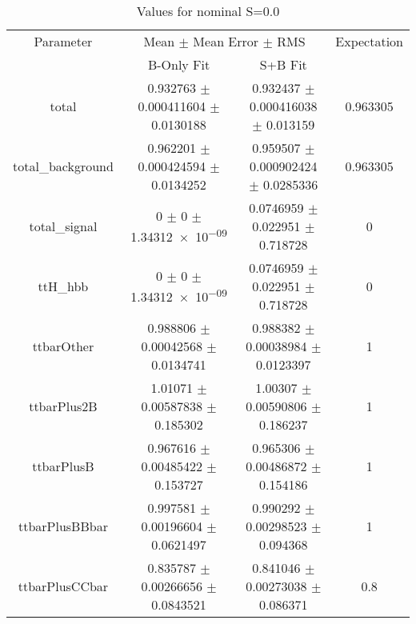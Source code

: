 \begin{table}
\centering
\caption{Values for nominal S=0.0}
\begin{tabular}{cccc}
\toprule
Parameter & \multicolumn{2}{c}{Mean $\pm$ Mean Error $\pm$ RMS} & Expectation\\
 & B-Only Fit & S+B Fit & \\
\midrule
total & \num{0.932763} $\pm$ \num{0.000411604} $\pm$ \num{0.0130188} & \num{0.932437} $\pm$ \num{0.000416038} $\pm$ \num{0.013159} & \num{0.963305}\\
total\_background & \num{0.962201} $\pm$ \num{0.000424594} $\pm$ \num{0.0134252} & \num{0.959507} $\pm$ \num{0.000902424} $\pm$ \num{0.0285336} & \num{0.963305}\\
total\_signal & \num{0} $\pm$ \num{0} $\pm$ \num{1.34312e-09} & \num{0.0746959} $\pm$ \num{0.022951} $\pm$ \num{0.718728} & \num{0}\\
ttH\_hbb & \num{0} $\pm$ \num{0} $\pm$ \num{1.34312e-09} & \num{0.0746959} $\pm$ \num{0.022951} $\pm$ \num{0.718728} & \num{0}\\
ttbarOther & \num{0.988806} $\pm$ \num{0.00042568} $\pm$ \num{0.0134741} & \num{0.988382} $\pm$ \num{0.00038984} $\pm$ \num{0.0123397} & \num{1}\\
ttbarPlus2B & \num{1.01071} $\pm$ \num{0.00587838} $\pm$ \num{0.185302} & \num{1.00307} $\pm$ \num{0.00590806} $\pm$ \num{0.186237} & \num{1}\\
ttbarPlusB & \num{0.967616} $\pm$ \num{0.00485422} $\pm$ \num{0.153727} & \num{0.965306} $\pm$ \num{0.00486872} $\pm$ \num{0.154186} & \num{1}\\
ttbarPlusBBbar & \num{0.997581} $\pm$ \num{0.00196604} $\pm$ \num{0.0621497} & \num{0.990292} $\pm$ \num{0.00298523} $\pm$ \num{0.094368} & \num{1}\\
ttbarPlusCCbar & \num{0.835787} $\pm$ \num{0.00266656} $\pm$ \num{0.0843521} & \num{0.841046} $\pm$ \num{0.00273038} $\pm$ \num{0.086371} & \num{0.8}\\
\bottomrule
\end{tabular}
\end{table}